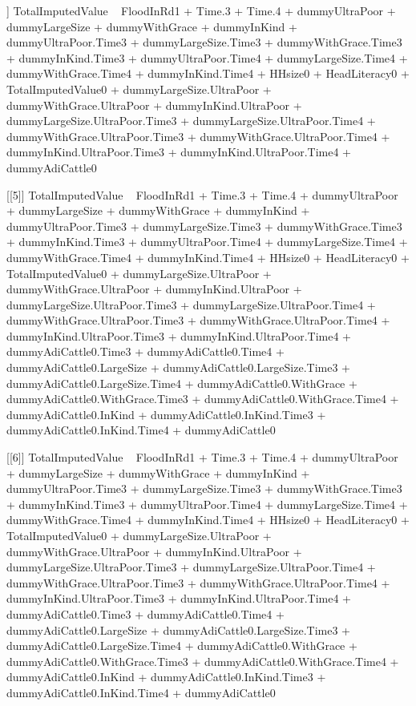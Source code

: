 \begin{Schunk}
\begin{Soutput}
[[4]]
TotalImputedValue ~ FloodInRd1 + Time.3 + Time.4 + dummyUltraPoor + 
    dummyLargeSize + dummyWithGrace + dummyInKind + dummyUltraPoor.Time3 + 
    dummyLargeSize.Time3 + dummyWithGrace.Time3 + dummyInKind.Time3 + 
    dummyUltraPoor.Time4 + dummyLargeSize.Time4 + dummyWithGrace.Time4 + 
    dummyInKind.Time4 + HHsize0 + HeadLiteracy0 + TotalImputedValue0 + 
    dummyLargeSize.UltraPoor + dummyWithGrace.UltraPoor + dummyInKind.UltraPoor + 
    dummyLargeSize.UltraPoor.Time3 + dummyLargeSize.UltraPoor.Time4 + 
    dummyWithGrace.UltraPoor.Time3 + dummyWithGrace.UltraPoor.Time4 + 
    dummyInKind.UltraPoor.Time3 + dummyInKind.UltraPoor.Time4 + 
    dummyAdiCattle0

[[5]]
TotalImputedValue ~ FloodInRd1 + Time.3 + Time.4 + dummyUltraPoor + 
    dummyLargeSize + dummyWithGrace + dummyInKind + dummyUltraPoor.Time3 + 
    dummyLargeSize.Time3 + dummyWithGrace.Time3 + dummyInKind.Time3 + 
    dummyUltraPoor.Time4 + dummyLargeSize.Time4 + dummyWithGrace.Time4 + 
    dummyInKind.Time4 + HHsize0 + HeadLiteracy0 + TotalImputedValue0 + 
    dummyLargeSize.UltraPoor + dummyWithGrace.UltraPoor + dummyInKind.UltraPoor + 
    dummyLargeSize.UltraPoor.Time3 + dummyLargeSize.UltraPoor.Time4 + 
    dummyWithGrace.UltraPoor.Time3 + dummyWithGrace.UltraPoor.Time4 + 
    dummyInKind.UltraPoor.Time3 + dummyInKind.UltraPoor.Time4 + 
    dummyAdiCattle0.Time3 + dummyAdiCattle0.Time4 + dummyAdiCattle0.LargeSize + 
    dummyAdiCattle0.LargeSize.Time3 + dummyAdiCattle0.LargeSize.Time4 + 
    dummyAdiCattle0.WithGrace + dummyAdiCattle0.WithGrace.Time3 + 
    dummyAdiCattle0.WithGrace.Time4 + dummyAdiCattle0.InKind + 
    dummyAdiCattle0.InKind.Time3 + dummyAdiCattle0.InKind.Time4 + 
    dummyAdiCattle0

[[6]]
TotalImputedValue ~ FloodInRd1 + Time.3 + Time.4 + dummyUltraPoor + 
    dummyLargeSize + dummyWithGrace + dummyInKind + dummyUltraPoor.Time3 + 
    dummyLargeSize.Time3 + dummyWithGrace.Time3 + dummyInKind.Time3 + 
    dummyUltraPoor.Time4 + dummyLargeSize.Time4 + dummyWithGrace.Time4 + 
    dummyInKind.Time4 + HHsize0 + HeadLiteracy0 + TotalImputedValue0 + 
    dummyLargeSize.UltraPoor + dummyWithGrace.UltraPoor + dummyInKind.UltraPoor + 
    dummyLargeSize.UltraPoor.Time3 + dummyLargeSize.UltraPoor.Time4 + 
    dummyWithGrace.UltraPoor.Time3 + dummyWithGrace.UltraPoor.Time4 + 
    dummyInKind.UltraPoor.Time3 + dummyInKind.UltraPoor.Time4 + 
    dummyAdiCattle0.Time3 + dummyAdiCattle0.Time4 + dummyAdiCattle0.LargeSize + 
    dummyAdiCattle0.LargeSize.Time3 + dummyAdiCattle0.LargeSize.Time4 + 
    dummyAdiCattle0.WithGrace + dummyAdiCattle0.WithGrace.Time3 + 
    dummyAdiCattle0.WithGrace.Time4 + dummyAdiCattle0.InKind + 
    dummyAdiCattle0.InKind.Time3 + dummyAdiCattle0.InKind.Time4 + 
    dummyAdiCattle0
\end{Soutput}
\end{Schunk}
